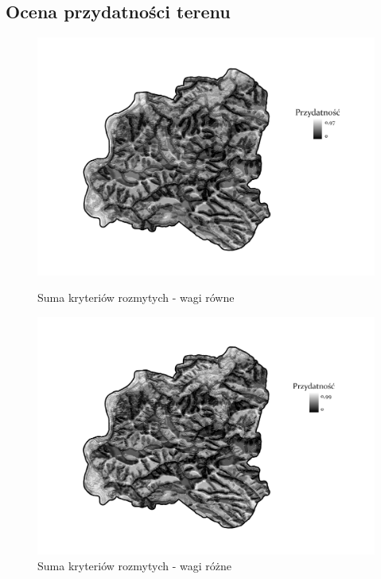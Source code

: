\documentclass{article}
\begin{document}
\subsection{Ocena przydatności terenu}
\begin{figure}[H]
    \begin{minipage}[t]{0.48\textwidth}
        \centering
        \includegraphics[width=\linewidth]{img/plesna-rozmyte-layout.jpg}
        \caption{Suma kryteriów rozmytych - wagi równe}
        \label{fig:rozmyte-rowne}
    \end{minipage}
    \hfill
    \begin{minipage}[t]{0.48\textwidth}
        \centering
        \includegraphics[width=\linewidth]{img/roznewagi-plesna-rozmyte-layout.jpg}
        \caption{Suma kryteriów rozmytych - wagi różne}
        \label{fig:rozmyte-rozne}
    \end{minipage}
\end{figure}
\end{document}
